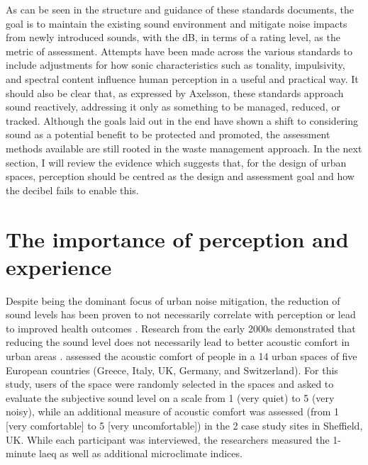 As can be seen in the structure and guidance of these standards documents, the goal is to maintain the existing sound environment and mitigate noise impacts from newly introduced sounds, with the dB, in terms of a rating level, as the metric of assessment. Attempts have been made across the various standards to include adjustments for how sonic characteristics such as tonality, impulsivity, and spectral content influence human perception in a useful and practical way. It should also be clear that, as expressed by Axelsson, these standards approach sound reactively, addressing it only as something to be managed, reduced, or tracked. Although the goals laid out in the \gls{end} have shown a shift to considering sound as a potential benefit to be protected and promoted, the assessment methods available are still rooted in the waste management approach. In the next section, I will review the evidence which suggests that, for the design of urban spaces, perception should be centred as the design and assessment goal and how the decibel fails to enable this.

\section{The importance of perception and experience}


Despite being the dominant focus of urban noise mitigation, the reduction of sound levels has been proven to not necessarily correlate with perception or lead to improved health outcomes \citep{Kang2016Ten,Kang2006Urban} . Research from the early 2000s demonstrated that reducing the sound level does not necessarily lead to better acoustic comfort in urban areas \citep{DeRuiter2000Noise,SchulteFortkamp2001Quality}. \citet{Yang2005Acoustic} assessed the acoustic comfort of people in a 14 urban spaces of five European countries (Greece, Italy, UK, Germany, and Switzerland). For this study, users of the space were randomly selected in the spaces and asked to evaluate the subjective sound level on a scale from 1 (very quiet) to 5 (very noisy), while an additional measure of acoustic comfort was assessed (from 1 [very comfortable] to 5 [very uncomfortable]) in the 2 case study sites in Sheffield, UK. While each participant was interviewed, the researchers measured the 1-minute \gls{laeq} as well as additional microclimate indices. 

